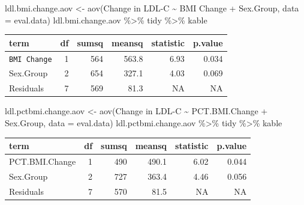 \documentclass[
]{article}
\newenvironment{Shaded}{\begin{snugshade}}{\end{snugshade}}
\newcommand{\AttributeTok}[1]{\textcolor[rgb]{0.77,0.63,0.00}{#1}}
\newcommand{\FunctionTok}[1]{\textcolor[rgb]{0.00,0.00,0.00}{#1}}
\newcommand{\NormalTok}[1]{#1}
\newcommand{\OtherTok}[1]{\textcolor[rgb]{0.56,0.35,0.01}{#1}}
\newcommand{\SpecialCharTok}[1]{\textcolor[rgb]{0.00,0.00,0.00}{#1}}
\newcommand{\StringTok}[1]{\textcolor[rgb]{0.31,0.60,0.02}{#1}}
\begin{document}
\begin{Shaded}
\begin{Highlighting}[]
\NormalTok{ldl.bmi.change.aov }\OtherTok{\textless{}{-}} \FunctionTok{aov}\NormalTok{(}\StringTok{\textasciigrave{}}\AttributeTok{Change in LDL{-}C}\StringTok{\textasciigrave{}} \SpecialCharTok{\textasciitilde{}} \StringTok{\textasciigrave{}}\AttributeTok{BMI Change}\StringTok{\textasciigrave{}} \SpecialCharTok{+} \StringTok{\textasciigrave{}}\AttributeTok{Sex.Group}\StringTok{\textasciigrave{}}\NormalTok{, }\AttributeTok{data =}\NormalTok{ eval.data)}
\NormalTok{ldl.bmi.change.aov }\SpecialCharTok{\%\textgreater{}\%}\NormalTok{ tidy }\SpecialCharTok{\%\textgreater{}\%}\NormalTok{ kable}
\end{Highlighting}
\end{Shaded}

\begin{longtable}[]{@{}lrrrrr@{}}
\toprule
term & df & sumsq & meansq & statistic & p.value \\
\midrule
\endhead
\texttt{BMI\ Change} & 1 & 564 & 563.8 & 6.93 & 0.034 \\
Sex.Group & 2 & 654 & 327.1 & 4.03 & 0.069 \\
Residuals & 7 & 569 & 81.3 & NA & NA \\
\bottomrule
\end{longtable}

\begin{Shaded}
\begin{Highlighting}[]
\NormalTok{ldl.pctbmi.change.aov }\OtherTok{\textless{}{-}} \FunctionTok{aov}\NormalTok{(}\StringTok{\textasciigrave{}}\AttributeTok{Change in LDL{-}C}\StringTok{\textasciigrave{}} \SpecialCharTok{\textasciitilde{}} \StringTok{\textasciigrave{}}\AttributeTok{PCT.BMI.Change}\StringTok{\textasciigrave{}} \SpecialCharTok{+} \StringTok{\textasciigrave{}}\AttributeTok{Sex.Group}\StringTok{\textasciigrave{}}\NormalTok{, }\AttributeTok{data =}\NormalTok{ eval.data)}
\NormalTok{ldl.pctbmi.change.aov }\SpecialCharTok{\%\textgreater{}\%}\NormalTok{ tidy }\SpecialCharTok{\%\textgreater{}\%}\NormalTok{ kable}
\end{Highlighting}
\end{Shaded}

\begin{longtable}[]{@{}lrrrrr@{}}
\toprule
term & df & sumsq & meansq & statistic & p.value \\
\midrule
\endhead
PCT.BMI.Change & 1 & 490 & 490.1 & 6.02 & 0.044 \\
Sex.Group & 2 & 727 & 363.4 & 4.46 & 0.056 \\
Residuals & 7 & 570 & 81.5 & NA & NA \\
\bottomrule
\end{longtable}
\end{document}

